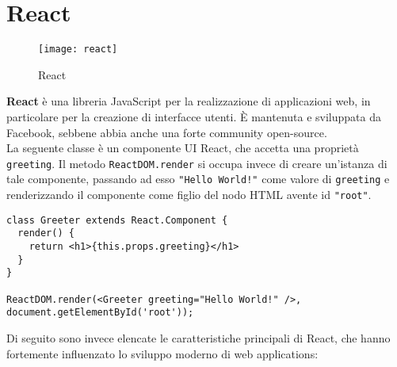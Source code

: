 \section{React}

\begin{figure}[H] 
  \centering 
  \texttt{[image: react]} 
  \caption{React}
\end{figure}

\textbf{React} è una libreria JavaScript per la realizzazione di applicazioni web, in particolare per la creazione di interfacce utenti. È mantenuta e sviluppata da Facebook, sebbene abbia anche una forte community open-source. \\

La seguente classe è un componente UI React, che accetta una proprietà \texttt{greeting}. Il metodo \texttt{ReactDOM.render} si occupa invece di creare un'istanza di tale componente, passando ad esso \texttt{"Hello World!"} come valore di \texttt{greeting} e renderizzando il componente come figlio del nodo HTML avente id \texttt{"root"}. \\

\begin{lstlisting}[language={[Sharp]C}]
class Greeter extends React.Component { 
  render() { 
    return <h1>{this.props.greeting}</h1>
  } 
} 

ReactDOM.render(<Greeter greeting="Hello World!" />, document.getElementById('root'));
\end{lstlisting}

Di seguito sono invece elencate le caratteristiche principali di React, che hanno fortemente influenzato lo sviluppo moderno di web applications:

